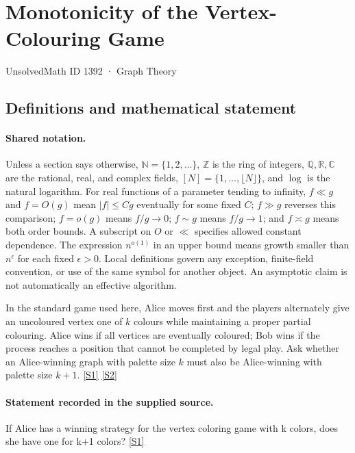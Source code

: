 \documentclass[11pt,a4paper]{article}
\newcommand{\N}{\mathbb{N}}
\newcommand{\Z}{\mathbb{Z}}
\newcommand{\Q}{\mathbb{Q}}
\newcommand{\R}{\mathbb{R}}
\newcommand{\C}{\mathbb{C}}
\newcommand{\sref}[2]{\hyperlink{source:#1:#2}{[S#2]}}
\begin{document}

\setcounter{section}{1391}

\section{Monotonicity of the Vertex-Colouring Game}\label{1392}

{\small\sffamily UnsolvedMath ID 1392 · Graph Theory}

\subsection{Definitions and mathematical statement}

\paragraph{Shared notation.}Unless a section says otherwise, $\N=\{1,2,\ldots\}$,
$\Z$ is the ring of integers, $\Q,\R,\C$ are the rational, real, and complex
fields, $[N]=\{1,\ldots,\lfloor N\rfloor\}$, and $\log$ is the natural
logarithm. For real functions of a parameter tending to infinity,
$f\ll g$ and $f=O(g)$ mean $|f|\leq Cg$ eventually for some fixed $C$;
$f\gg g$ reverses this comparison; $f=o(g)$ means $f/g\to0$;
$f\sim g$ means $f/g\to1$; and $f\asymp g$ means both order bounds.
A subscript on $O$ or $\ll$ specifies allowed constant dependence.
The expression $n^{o(1)}$ in an upper bound means growth smaller than
$n^\epsilon$ for each fixed $\epsilon>0$. Local definitions govern any
exception, finite-field convention, or use of the same symbol for another
object. An asymptotic claim is not automatically an effective algorithm.



In the standard game used here, Alice moves first and the players alternately give an uncoloured vertex one of $k$ colours while maintaining a proper partial colouring. Alice wins if all vertices are eventually coloured; Bob wins if the process reaches a position that cannot be completed by legal play. Ask whether an Alice-winning graph with palette size $k$ must also be Alice-winning with palette size $k+1$. \sref{1392}{1} \sref{1392}{2}

\paragraph{Statement recorded in the supplied source.}
If Alice has a winning strategy for the vertex coloring game with k colors, does she have one for k+1 colors? \sref{1392}{1}
\end{document}
